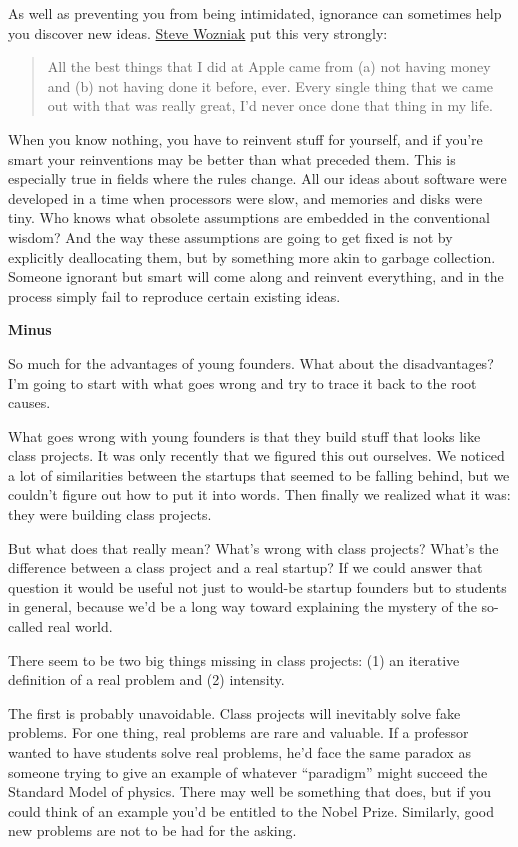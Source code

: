 As well as preventing you from being intimidated, ignorance can
sometimes help you discover new ideas.
\href{http://foundersatwork.com/stevewozniak.html}{Steve Wozniak} put
this very strongly:

\begin{quote}
All the best things that I did at Apple came from (a) not having money
and (b) not having done it before, ever. Every single thing that we came
out with that was really great, I'd never once done that thing in my
life.
\end{quote}

When you know nothing, you have to reinvent stuff for yourself, and if
you're smart your reinventions may be better than what preceded them.
This is especially true in fields where the rules change. All our ideas
about software were developed in a time when processors were slow, and
memories and disks were tiny. Who knows what obsolete assumptions are
embedded in the conventional wisdom? And the way these assumptions are
going to get fixed is not by explicitly deallocating them, but by
something more akin to garbage collection. Someone ignorant but smart
will come along and reinvent everything, and in the process simply fail
to reproduce certain existing ideas.

\textbf{Minus}

So much for the advantages of young founders. What about the
disadvantages? I'm going to start with what goes wrong and try to trace
it back to the root causes.

What goes wrong with young founders is that they build stuff that looks
like class projects. It was only recently that we figured this out
ourselves. We noticed a lot of similarities between the startups that
seemed to be falling behind, but we couldn't figure out how to put it
into words. Then finally we realized what it was: they were building
class projects.

But what does that really mean? What's wrong with class projects? What's
the difference between a class project and a real startup? If we could
answer that question it would be useful not just to would-be startup
founders but to students in general, because we'd be a long way toward
explaining the mystery of the so-called real world.

There seem to be two big things missing in class projects: (1) an
iterative definition of a real problem and (2) intensity.

The first is probably unavoidable. Class projects will inevitably solve
fake problems. For one thing, real problems are rare and valuable. If a
professor wanted to have students solve real problems, he'd face the
same paradox as someone trying to give an example of whatever
``paradigm'' might succeed the Standard Model of physics. There may well
be something that does, but if you could think of an example you'd be
entitled to the Nobel Prize. Similarly, good new problems are not to be
had for the asking.

